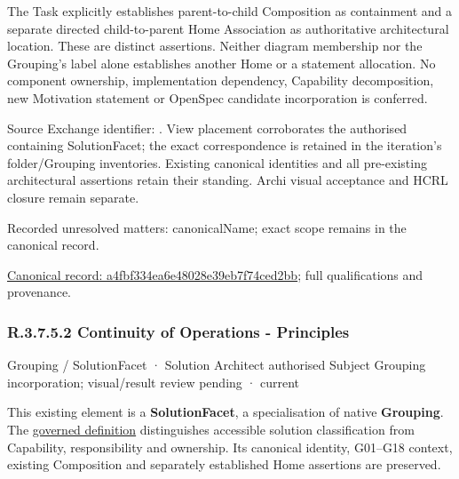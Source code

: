 The Task explicitly establishes parent-to-child Composition as containment and
a separate directed child-to-parent Home Association as authoritative architectural
location. These are distinct assertions. Neither diagram membership nor the
Grouping's label alone establishes another Home or a statement allocation.
No component ownership, implementation dependency, Capability decomposition,
new Motivation statement or OpenSpec candidate incorporation is conferred.



Source Exchange identifier: \texttt{}. View placement corroborates
the authorised containing SolutionFacet; the exact correspondence is retained in the
iteration's folder/Grouping inventories. Existing canonical identities and all
pre-existing architectural assertions retain their standing. Archi visual
acceptance and HCRL closure remain separate.


{\small Recorded unresolved matters: canonicalName; exact scope remains in the canonical record.}\par
{\footnotesize \href{../../../../../../../continuum/grouping/a4fbf334ea6e48028e39eb7f74ced2bb.md}{Canonical record: a4fbf334ea6e48028e39eb7f74ced2bb}; full qualifications and provenance.}\par
\subsubsection*{R.3.7.5.2 Continuity of Operations - Principles}
\label{navigation:R.3.7.5.2}

\label{element:aba77f43a26440dfb5e7cd67934e7ebd}
{\small Grouping / SolutionFacet · Solution Architect authorised Subject Grouping incorporation; visual/result review pending · current}\par

This existing element is a \textbf{SolutionFacet}, a specialisation of native
\textbf{Grouping}. The \href{\detokenize{../../../../../../../governance/continuum-representation.md#solutionfacet-classification--1119-candidate}}{governed definition}
distinguishes accessible solution classification from Capability, responsibility
and ownership. Its canonical identity, G01–G18 context, existing Composition
and separately established Home assertions are preserved.



